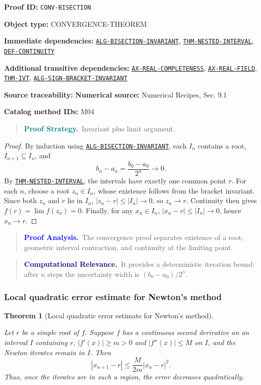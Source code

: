 \documentclass[10pt]{article}
\newcommand{\pidraw}[1]{\begingroup\urlstyle{tt}\nolinkurl{#1}\endgroup}
\newcommand{\pidref}[1]{\hyperref[prf:#1]{\pidraw{#1}}}
\newcommand{\pid}[1]{\pidref{#1}}
\newtheorem{theorem}{Theorem}[section]
\theoremstyle{definition}
\theoremstyle{remark}
\newenvironment{proofstrategy}
{\begin{quote}\small\noindent\textbf{\textcolor{teal}{Proof Strategy.}}\ }
{\end{quote}}
\newenvironment{proofanalysis}
{\begin{quote}\small\noindent\textbf{\textcolor{blue}{Proof Analysis.}}\ }
{\end{quote}}
\newenvironment{computationalrelevance}
{\begin{quote}\small\noindent\textbf{\textcolor{navy}{Computational Relevance.}}\ }
{\end{quote}}
\newcommand{\meta}[2]{\noindent\textbf{#1:} #2\par}
\begin{document}
\meta{Proof ID}{\pidraw{CONV-BISECTION}}
\meta{Object type}{CONVERGENCE-THEOREM}
\meta{Immediate dependencies}{\pidref{ALG-BISECTION-INVARIANT}, \pidref{THM-NESTED-INTERVAL}, \pidref{DEF-CONTINUITY}}
\meta{Additional transitive dependencies}{\pidref{AX-REAL-COMPLETENESS}, \pidref{AX-REAL-FIELD}, \pidref{THM-IVT}, \pidref{ALG-SIGN-BRACKET-INVARIANT}}
\meta{Source traceability}{\textbf{Numerical source:} Numerical Recipes, Sec. 9.1}
\meta{Catalog method IDs}{M04}

\begin{proofstrategy}Invariant plus limit argument.\end{proofstrategy}

\begin{proof}

By induction using \pid{ALG-BISECTION-INVARIANT}, each $I_n$ contains a root,
$I_{n+1}\subseteq I_n$, and
\[
b_n-a_n=\frac{b_0-a_0}{2^n}\to0.
\]
By \pid{THM-NESTED-INTERVAL}, the intervals have exactly one common point $r$.
For each $n$, choose a root $z_n\in I_n$, whose existence follows from the bracket
invariant. Since both $z_n$ and $r$ lie in $I_n$,
$|z_n-r|\le |I_n|\to0$, so $z_n\to r$. Continuity then gives
$f(r)=\lim f(z_n)=0$. Finally, for any $x_n\in I_n$,
$|x_n-r|\le|I_n|\to0$, hence $x_n\to r$.

\end{proof}

\begin{proofanalysis}The convergence proof separates existence of a root, geometric interval contraction, and continuity at the limiting point.\end{proofanalysis}

\begin{computationalrelevance}It provides a deterministic iteration bound: after $n$ steps the uncertainty width is $(b_0-a_0)/2^n$.\end{computationalrelevance}

\subsubsection{Local quadratic error estimate for Newton's method}

\begin{theorem}[Local quadratic error estimate for Newton's method]\label{prf:CONV-NEWTON-LOCAL}

Let $r$ be a simple root of $f$. Suppose $f$ has a continuous second derivative on an interval $I$ containing $r$, $|f'(x)|\ge m>0$ and $|f''(x)|\le M$ on $I$, and the Newton iterates remain in $I$. Then
\[
|x_{n+1}-r|\le \frac{M}{2m}|x_n-r|^2.
\]
Thus, once the iterates are in such a region, the error decreases quadratically.

\end{theorem}
\end{document}
